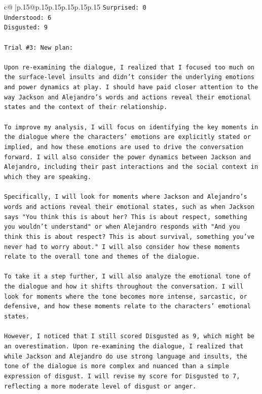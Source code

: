 \documentclass{article}
\begin{document}
{\begin{supertabular}{c@{$\;$}|p{.15\linewidth}@{}p{.15\linewidth}p{.15\linewidth}p{.15\linewidth}p{.15\linewidth}p{.15\linewidth}}
{{{\texttt{Surprised: 0} \\
\texttt{Understood: 6} \\
\texttt{Disgusted: 9} \\
\\ 
\texttt{Trial \#3: New plan: } \\
\\ 
\texttt{Upon re{-}examining the dialogue, I realized that I focused too much on the surface{-}level insults and didn't consider the underlying emotions and power dynamics at play. I should have paid closer attention to the way Jackson and Alejandro's words and actions reveal their emotional states and the context of their relationship.} \\
\\ 
\texttt{To improve my analysis, I will focus on identifying the key moments in the dialogue where the characters' emotions are explicitly stated or implied, and how these emotions are used to drive the conversation forward. I will also consider the power dynamics between Jackson and Alejandro, including their past interactions and the social context in which they are speaking.} \\
\\ 
\texttt{Specifically, I will look for moments where Jackson and Alejandro's words and actions reveal their emotional states, such as when Jackson says "You think this is about her? This is about respect, something you wouldn't understand" or when Alejandro responds with "And you think this is about respect? This is about survival, something you've never had to worry about." I will also consider how these moments relate to the overall tone and themes of the dialogue.} \\
\\ 
\texttt{To take it a step further, I will also analyze the emotional tone of the dialogue and how it shifts throughout the conversation. I will look for moments where the tone becomes more intense, sarcastic, or defensive, and how these moments relate to the characters' emotional states.} \\
\\ 
\texttt{However, I noticed that I still scored Disgusted as 9, which might be an overestimation. Upon re{-}examining the dialogue, I realized that while Jackson and Alejandro do use strong language and insults, the tone of the dialogue is more complex and nuanced than a simple expression of disgust. I will revise my score for Disgusted to 7, reflecting a more moderate level of disgust or anger.} \\
}}}
\end{supertabular}}
\end{document}
